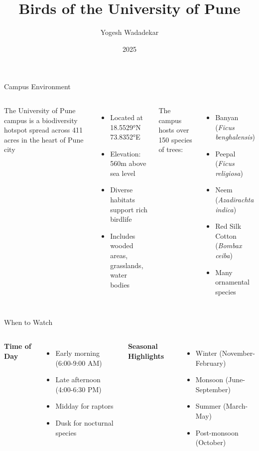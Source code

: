 \documentclass[aspectratio=169]{beamer}
\title{Birds of the University of Pune}
\author{Yogesh Wadadekar}
\institute{Savitribai Phule Pune University}
\date{2025}
\begin{document}
\begin{frame}
    \maketitle
\end{frame}

\begin{frame}{Campus Environment}
    \begin{columns}[T]
        The University of Pune campus is a biodiversity hotspot spread across 411 acres in the heart of Pune city
        \begin{itemize}
            \item Located at 18.5529°N 73.8352°E
            \item Elevation: 560m above sea level
            \item Diverse habitats support rich birdlife
            \item Includes wooded areas, grasslands, water bodies
        \end{itemize}
        The campus hosts over 150 species of trees:
        \begin{itemize}
            \item Banyan (\textit{Ficus benghalensis})
            \item Peepal (\textit{Ficus religiosa})
            \item Neem (\textit{Azadirachta indica})
            \item Red Silk Cotton (\textit{Bombax ceiba})
            \item Many ornamental species
        \end{itemize}
    \end{columns}
\end{frame}

\begin{frame}{When to Watch}
    \begin{columns}[T]
        \textbf{Time of Day}
        \begin{itemize}
            \item Early morning (6:00-9:00 AM)
            \item Late afternoon (4:00-6:30 PM)
            \item Midday for raptors
            \item Dusk for nocturnal species
        \end{itemize}
        \textbf{Seasonal Highlights}
        \begin{itemize}
            \item Winter (November-February)
            \item Monsoon (June-September)
            \item Summer (March-May)
            \item Post-monsoon (October)
        \end{itemize}
    \end{columns}
\end{frame}
\end{document}
